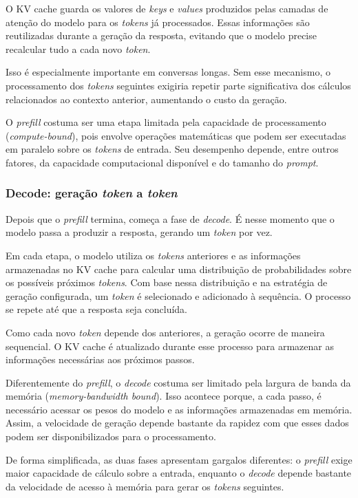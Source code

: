 \documentclass[12pt, a4paper]{article}
\begin{document}
O KV cache guarda os valores de \textit{keys} e \textit{values} produzidos pelas camadas de atenção do modelo para os \textit{tokens} já processados. Essas informações são reutilizadas durante a geração da resposta, evitando que o modelo precise recalcular tudo a cada novo \textit{token}.

Isso é especialmente importante em conversas longas. Sem esse mecanismo, o processamento dos \textit{tokens} seguintes exigiria repetir parte significativa dos cálculos relacionados ao contexto anterior, aumentando o custo da geração.

O \textit{prefill} costuma ser uma etapa limitada pela capacidade de processamento (\textit{compute-bound}), pois envolve operações matemáticas que podem ser executadas em paralelo sobre os \textit{tokens} de entrada. Seu desempenho depende, entre outros fatores, da capacidade computacional disponível e do tamanho do \textit{prompt}.

\subsubsection{Decode: geração \textit{token} a \textit{token}}
Depois que o \textit{prefill} termina, começa a fase de \textit{decode}. É nesse momento que o modelo passa a produzir a resposta, gerando um \textit{token} por vez.

Em cada etapa, o modelo utiliza os \textit{tokens} anteriores e as informações armazenadas no KV cache para calcular uma distribuição de probabilidades sobre os possíveis próximos \textit{tokens}. Com base nessa distribuição e na estratégia de geração configurada, um \textit{token} é selecionado e adicionado à sequência. O processo se repete até que a resposta seja concluída.

Como cada novo \textit{token} depende dos anteriores, a geração ocorre de maneira sequencial. O KV cache é atualizado durante esse processo para armazenar as informações necessárias aos próximos passos.

Diferentemente do \textit{prefill}, o \textit{decode} costuma ser limitado pela largura de banda da memória (\textit{memory-bandwidth bound}). Isso acontece porque, a cada passo, é necessário acessar os pesos do modelo e as informações armazenadas em memória. Assim, a velocidade de geração depende bastante da rapidez com que esses dados podem ser disponibilizados para o processamento.

De forma simplificada, as duas fases apresentam gargalos diferentes: o \textit{prefill} exige maior capacidade de cálculo sobre a entrada, enquanto o \textit{decode} depende bastante da velocidade de acesso à memória para gerar os \textit{tokens} seguintes.
\end{document}
